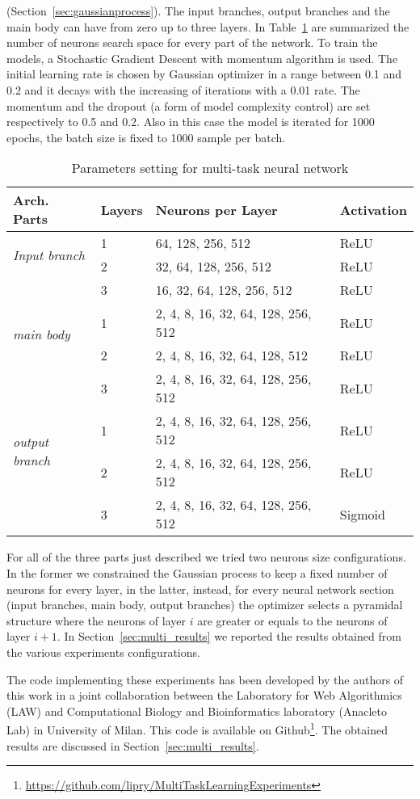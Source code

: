 (Section~\ref{sec:gaussianprocess}). The input branches, output branches and
the main body can have from zero up to three layers. In Table~\ref{tab:mplmtl} are summarized the number of neurons search space for every part of the network. 
To train the models, a Stochastic Gradient Descent with momentum algorithm is used. The initial learning rate is chosen by Gaussian optimizer in a range between 0.1 and 0.2 and it decays with the increasing of iterations with a 0.01 rate. The momentum and the dropout (a form of model complexity control) are set respectively to 0.5 and 0.2. Also in this case the model is iterated for 1000 epochs, the batch size is fixed to 1000 sample per batch. 
\begin{table}[t]
\centering
\begin{tabular}{llll}
\toprule
\textbf{Arch. Parts} & \textbf{Layers} & \textbf{Neurons per Layer} & \textbf{Activation} \\ 
\midrule
\multirow{2}{*}{\textit{Input branch}}  & 1 & 64, 128, 256, 512 & ReLU \\ 
{} & 2 & 32, 64, 128, 256, 512 & ReLU \\
{} & 3 & 16, 32, 64, 128, 256, 512 & ReLU \\
\midrule
\multirow{2}{*}{\textit{main body}} & 1 & 2, 4, 8, 16, 32, 64, 128, 256, 512 & ReLU \\ 
{} & 2 & 2, 4, 8, 16, 32, 64, 128, 512 & ReLU \\
{} & 3 & 2, 4, 8, 16, 32, 64, 128, 256, 512 & ReLU \\
\midrule
\multirow{2}{*}{\textit{output branch}} & 1 & 2, 4, 8, 16, 32, 64, 128, 256, 512 & ReLU\\ 
{} & 2 & 2, 4, 8, 16, 32, 64, 128, 256, 512 & ReLU \\
{} & 3 & 2, 4, 8, 16, 32, 64, 128, 256, 512 & Sigmoid \\
\bottomrule
\end{tabular}
\caption{Parameters setting for multi-task neural network}
\label{tab:mplmtl}
\end{table}
For all of the three parts just described we tried two neurons size configurations. In the former we constrained the Gaussian process to keep a fixed number of neurons for every layer, in the latter, instead, for every neural network section (input branches, main body, output branches) the optimizer selects a pyramidal structure where the neurons of layer $i$ are greater or equals to the neurons of layer $i+1$.
In Section~\ref{sec:multi_results} we reported the results obtained from the various experiments configurations. 

The code implementing these experiments has been developed by the authors of this work in a joint collaboration between the Laboratory for Web Algorithmics (LAW) and Computational Biology and Bioinformatics laboratory (Anacleto Lab) in University of Milan. This code is available on Github\footnote{\url{https://github.com/lipry/MultiTaskLearningExperiments}}. The obtained results are discussed in Section~\ref{sec:multi_results}.

